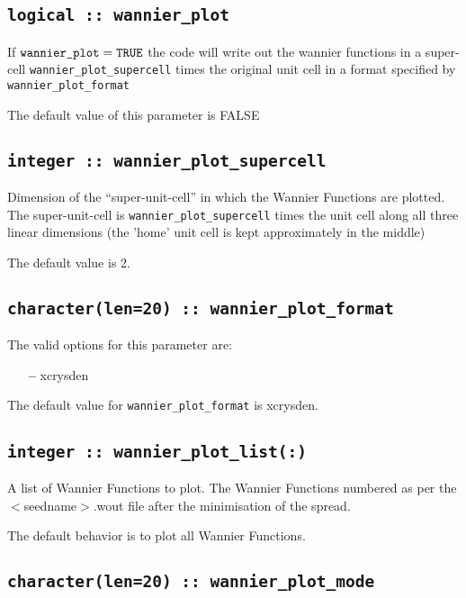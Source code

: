\subsection[wannier\_plot]{\tt logical :: wannier\_plot}

If $\verb#wannier_plot#=\verb#TRUE#$ the code will write out the
wannier functions in a super-cell \verb#wannier_plot_supercell# times
the original unit cell in a format specified by \verb#wannier_plot_format#

The default value of this parameter is FALSE

\subsection[wannier\_plot\_supercell]{\tt integer :: wannier\_plot\_supercell}

Dimension of the ``super-unit-cell'' in which the Wannier Functions are plotted.
The super-unit-cell is \verb#wannier_plot_supercell# times the unit cell along all three
linear dimensions (the 'home' unit cell is kept approximately
in the middle)

The default value is 2.

\subsection[wannier\_plot\_format]{\tt character(len=20) :: wannier\_plot\_format}

The valid options for this parameter are:
\begin{itemize}
\item[{\bf --}] xcrysden
\end{itemize}

The default value for \verb#wannier_plot_format# is xcrysden.

\subsection[wannier\_plot\_list]{\tt integer :: wannier\_plot\_list(:)}

 A list of Wannier Functions to plot. The Wannier Functions numbered as per the
 $<$seedname$>$.wout file after the minimisation of the spread.

 The default behavior is to plot all Wannier Functions.

\subsection[wannier\_plot\_mode]{\tt character(len=20) :: wannier\_plot\_mode}

